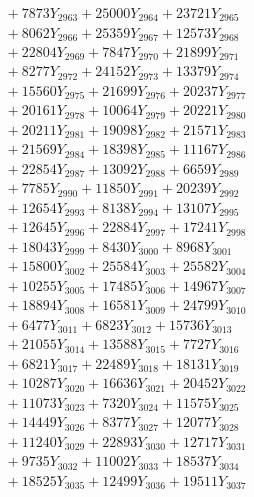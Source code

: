 \documentclass[a4paper,10pt]{article}
\begin{document}
{\begin{align}
&\;  + 7873 Y_{2963} + 25000 Y_{2964} + 23721 Y_{2965} \\[0.3ex]
&\;  + 8062 Y_{2966} + 25359 Y_{2967} + 12573 Y_{2968} \\[0.5ex]\allowbreak
&\;  + 22804 Y_{2969} + 7847 Y_{2970} + 21899 Y_{2971} \\[0.3ex]
&\;  + 8277 Y_{2972} + 24152 Y_{2973} + 13379 Y_{2974} \\[0.3ex]
&\;  + 15560 Y_{2975} + 21699 Y_{2976} + 20237 Y_{2977} \\[0.3ex]
&\;  + 20161 Y_{2978} + 10064 Y_{2979} + 20221 Y_{2980} \\[0.3ex]
&\;  + 20211 Y_{2981} + 19098 Y_{2982} + 21571 Y_{2983} \\[0.3ex]
&\;  + 21569 Y_{2984} + 18398 Y_{2985} + 11167 Y_{2986} \\[0.3ex]
&\;  + 22854 Y_{2987} + 13092 Y_{2988} + 6659 Y_{2989} \\[0.3ex]
&\;  + 7785 Y_{2990} + 11850 Y_{2991} + 20239 Y_{2992} \\[0.3ex]
&\;  + 12654 Y_{2993} + 8138 Y_{2994} + 13107 Y_{2995} \\[0.3ex]
&\;  + 12645 Y_{2996} + 22884 Y_{2997} + 17241 Y_{2998} \\[0.5ex]\allowbreak
&\;  + 18043 Y_{2999} + 8430 Y_{3000} + 8968 Y_{3001} \\[0.3ex]
&\;  + 15800 Y_{3002} + 25584 Y_{3003} + 25582 Y_{3004} \\[0.3ex]
&\;  + 10255 Y_{3005} + 17485 Y_{3006} + 14967 Y_{3007} \\[0.3ex]
&\;  + 18894 Y_{3008} + 16581 Y_{3009} + 24799 Y_{3010} \\[0.3ex]
&\;  + 6477 Y_{3011} + 6823 Y_{3012} + 15736 Y_{3013} \\[0.3ex]
&\;  + 21055 Y_{3014} + 13588 Y_{3015} + 7727 Y_{3016} \\[0.3ex]
&\;  + 6821 Y_{3017} + 22489 Y_{3018} + 18131 Y_{3019} \\[0.3ex]
&\;  + 10287 Y_{3020} + 16636 Y_{3021} + 20452 Y_{3022} \\[0.3ex]
&\;  + 11073 Y_{3023} + 7320 Y_{3024} + 11575 Y_{3025} \\[0.3ex]
&\;  + 14449 Y_{3026} + 8377 Y_{3027} + 12077 Y_{3028} \\[0.5ex]\allowbreak
&\;  + 11240 Y_{3029} + 22893 Y_{3030} + 12717 Y_{3031} \\[0.3ex]
&\;  + 9735 Y_{3032} + 11002 Y_{3033} + 18537 Y_{3034} \\[0.3ex]
&\;  + 18525 Y_{3035} + 12499 Y_{3036} + 19511 Y_{3037} \\[0.3ex]

\end{align}}
\end{document}
